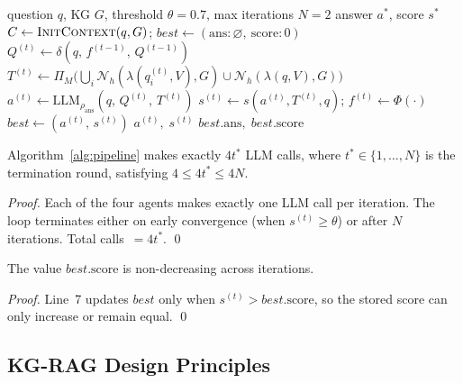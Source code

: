 \documentclass[runningheads]{llncs}
\newcommand{\sys}{\textsc{CoMaGRAG}\xspace}
\newcommand{\calN}{\mathcal{N}}
\begin{document}
\begin{algorithm}[t]
\caption{\sys Pipeline}
\label{alg:pipeline}
\begin{algorithmic}[1]
\Require question $q$, KG $G$, threshold $\theta{=}0.7$, max iterations $N{=}2$
\Ensure answer $a^*$, score $s^*$
\State $C \leftarrow \textsc{InitContext}(q, G)$;\quad
       $\mathit{best} \leftarrow (\text{ans}:\varnothing,\ \text{score}:0)$
  \State $Q^{(t)} \leftarrow \delta(q,\,f^{(t-1)},\,Q^{(t-1)})$
  \State $T^{(t)} \leftarrow \Pi_M\!\bigl(
         \bigcup_i\calN_h(\lambda(q_i^{(t)},V),G)\cup\calN_h(\lambda(q,V),G)
         \bigr)$
  \State $a^{(t)} \leftarrow \mathrm{LLM}_{\rho_\text{ans}}(q,\,Q^{(t)},\,T^{(t)})$
  \State $s^{(t)} \leftarrow s(a^{(t)},T^{(t)},q)$;\quad
         $f^{(t)} \leftarrow \Phi(\cdot)$
    $\mathit{best} \leftarrow (a^{(t)},\,s^{(t)})$
  \EndIf
    \Return $a^{(t)},\;s^{(t)}$
  \EndIf
\EndFor
\Return $\mathit{best}.\text{ans},\;\mathit{best}.\text{score}$
\end{algorithmic}
\end{algorithm}

\begin{proposition}
Algorithm~\ref{alg:pipeline} makes exactly $4t^*$ LLM calls, where
$t^*\in\{1,\ldots,N\}$ is the termination round, satisfying $4\leq 4t^*\leq 4N$.
\end{proposition}
\begin{proof}
Each of the four agents makes exactly one LLM call per iteration. The loop
terminates either on early convergence (when $s^{(t)}\geq\theta$) or after
$N$ iterations. Total calls~$=4t^*$.
\qed
\end{proof}

\begin{proposition}
The value $\mathit{best}.\text{score}$ is non-decreasing across iterations.
\end{proposition}
\begin{proof}
Line~7 updates $\mathit{best}$ only when $s^{(t)}>\mathit{best}.\text{score}$,
so the stored score can only increase or remain equal.
\qed
\end{proof}

\subsection{KG-RAG Design Principles}
\label{sec:principles}
\end{document}
